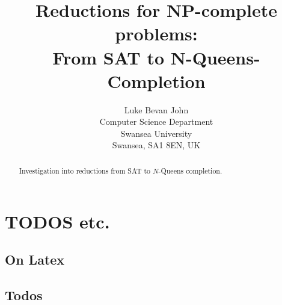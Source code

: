 \documentclass[a4paper]{report}
\begin{document}
\title{Reductions for NP-complete problems:\\ From SAT to N-Queens-Completion}

\author{Luke Bevan John\\
  Computer Science Department\\
  Swansea University\\
  Swansea, SA1 8EN, UK
}

\maketitle

\begin{abstract}
  Investigation into reductions from SAT to $N$-Queens completion.
\end{abstract}

\tableofcontents


\setcounter{chapter}{-1}

\chapter{TODOS etc.}
\label{cha:todos}

\section{On Latex}
\label{sec:todoslatex}

\cite{lamport94}


\section{Todos}
\label{sec:todostodos}
\end{document}
